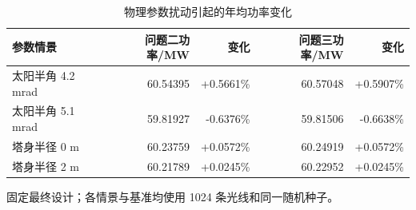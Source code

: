 \begin{table}[H]\centering\small
\caption{物理参数扰动引起的年均功率变化}\label{tab:sensitivity}
\begin{tabular}{lrrrr}\toprule
参数情景 & 问题二功率/MW & 变化 & 问题三功率/MW & 变化\\\midrule
太阳半角 4.2 mrad & 60.54395 & +0.5661\% & 60.57048 & +0.5907\%\\
太阳半角 5.1 mrad & 59.81927 & -0.6376\% & 59.81506 & -0.6638\%\\
塔身半径 0 m & 60.23759 & +0.0572\% & 60.24919 & +0.0572\%\\
塔身半径 2 m & 60.21789 & +0.0245\% & 60.22952 & +0.0245\%\\
\bottomrule\end{tabular}
\par\smallskip\begin{minipage}{.94\linewidth}\footnotesize 固定最终设计；各情景与基准均使用 1024 条光线和同一随机种子。\end{minipage}
\end{table}
